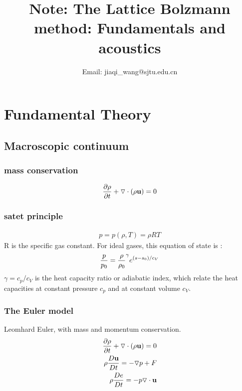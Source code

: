 \documentclass{Note}
\begin{document}
\title{Note: The Lattice Bolzmann method: Fundamentals and acoustics} 
\author{
     Email: jiaqi\_wang@sjtu.edu.cn
    } 

\maketitle

\section{Fundamental Theory}
\subsection{Macroscopic continuum}
\subsubsection{mass conservation}
\begin{equation}
\begin{aligned}
{\partial \rho \over \partial t}+\triangledown \cdot (\rho \textbf{u})=0
\end{aligned}
\end{equation}


\subsubsection{satet principle}
\begin{equation}
\begin{aligned}
p=p(\rho,T)=\rho RT
\end{aligned}
\end{equation}
R is the specific gas constant. For ideal gases, this equation of state is :
\begin{equation}
\begin{aligned}
{p\over p_0}={\rho\over \rho_0}^\gamma e^{(s-s_0)/c_V}
\end{aligned}
\end{equation}
$\gamma=c_p/c_V$ is the heat capacity ratio or adiabatic index, which relate the heat capacities at constant pressure $c_p$ and at constant volume $c_V$.

\subsubsection{The Euler model}
Leomhard Euler, with mass and momentum conservation.
\begin{equation}
\begin{aligned}
{\partial \rho \over \partial t}+\triangledown \cdot (\rho \textbf{u})=0\\
\rho{D\textbf{u}\over Dt}=-\triangledown p+F\\
\rho{De\over Dt}=-p\triangledown \cdot \textbf{u}
\end{aligned}
\end{equation}
\end{document}
